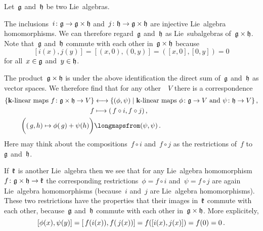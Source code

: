 \begin{example}
  \label{homomorphism out of a product}
  Let~$\mathfrak{g}$ and~$\mathfrak{h}$ be two Lie~algebras.
  
  The inclusions~$i \colon \mathfrak{g} \to \mathfrak{g} \times \mathfrak{h}$ and~$j \colon \mathfrak{h} \to \mathfrak{g} \times \mathfrak{h}$ are injective Lie~algebra homomorphisms.
  We can therefore regard~$\mathfrak{g}$ and~$\mathfrak{h}$ as Lie~subalgebras of~$\mathfrak{g} \times \mathfrak{h}$.
  Note that~$\mathfrak{g}$ and~$\mathfrak{h}$ commute with each other in~$\mathfrak{g} \times \mathfrak{h}$ because
  \[
    [i(x), j(y)]
    =
    [(x,0), (0,y)]
    =
    ( [x,0], [0,y] )
    =
    0
  \]
  for all~$x \in \mathfrak{g}$ and~$y \in \mathfrak{h}$.

  The product~$\mathfrak{g} \times \mathfrak{h}$ is under the above identification the direct sum of~$\mathfrak{g}$ and~$\mathfrak{h}$ as vector spaces.
  We therefore find that for any other~{\vectorspace{$\kf$}}~$V$ there is a {\onetoone} correspondence
  \begin{align*}
    \{ \text{{\linear{$\kf$}} maps~$f \colon \glie \times \hlie \to V$} \}
    &\longonetoone
    \{
      (\phi, \psi)
    \suchthat
      \text{{\linear{$\kf$}} maps~$\phi \colon \glie \to V$ and~$\psi \colon \hlie \to V$}
    \} \,,
    \\
    f
    &\longmapsto
    (\spacing f \circ i, f \circ j)  \,,
    \\
    \biggl( (\spacing g,h) \mapsto \phi(\spacing g) + \psi(h) \biggr)
    &\longmapsfrom
    (\psi, \psi)  \,.
  \end{align*}
  Here may think about the compositions~$f \circ i$ and~$f \circ j$ as the restrictions of~$f$ to~$\mathfrak{g}$ and~$\mathfrak{h}$.
  
  If~$\mathfrak{k}$ is another Lie~algebra then we see that for any Lie~algebra homomorphism~$f \colon \mathfrak{g} \times \mathfrak{h} \to \mathfrak{k}$ the corresponding restrictions~$\phi = f \circ i$ and~$\psi = f \circ j$ are again Lie~algebra homomorphisms (because~$i$ and~$j$ are Lie~algebra homomorphisms).
  These two restrictions have the properties that their images in~$\mathfrak{k}$ commute with each other, because~$\mathfrak{g}$ and~$\mathfrak{h}$ commute with each other in~$\mathfrak{g} \times \mathfrak{h}$.
  More explicitely,
  \[
    [\phi(x), \psi(y)]
    =
    [\, f(i(x)), f(\, j(x))]
    =
    f( [i(x), j(x)] )
    =
    f( 0 )
    =
    0 \,.
  \]
  

\end{example}

